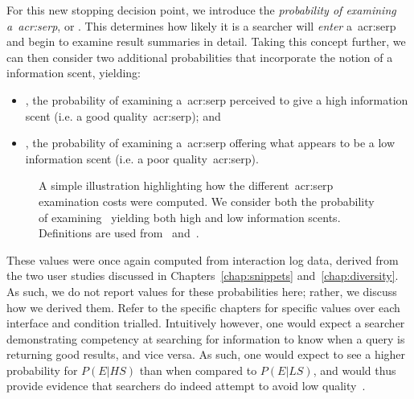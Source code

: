  For this new stopping decision point, we introduce the \emph{probability of examining a~\gls{acr:serp}}, or . This determines how likely it is a searcher will \emph{enter} a~\gls{acr:serp} and begin to examine result summaries in detail. Taking this concept further, we can then consider two additional probabilities that incorporate the notion of a~ information scent, yielding:

\begin{itemize}
    \item{, the probability of examining a~\gls{acr:serp} perceived to give a high information scent (i.e. a good quality~\gls{acr:serp}); and}
    \item{, the probability of examining a~\gls{acr:serp} offering what appears to be a low information scent (i.e. a poor quality~\gls{acr:serp}).}
\end{itemize}

\begin{figure}[t!]
    \centering
    \caption[Computing~\gls{acr:serp} examination probabilities]{A simple illustration highlighting how the different~\gls{acr:serp} examination costs were computed. We consider both the probability of examining~ yielding both high and low information scents. Definitions are used from~\cite{wu2014information_scent} and~\cite{hassan2013serp_abandonment}.}
    \label{fig:serp_probabilities}
\end{figure}

These values were once again computed from interaction log data, derived from the two user studies discussed in Chapters~\ref{chap:snippets} and~\ref{chap:diversity}. As such, we do not report values for these probabilities here; rather, we discuss how we derived them. Refer to the specific chapters for specific values over each interface and condition trialled. Intuitively however, one would expect a searcher demonstrating competency at searching for information to know when a query is returning good results, and vice versa. As such, one would expect to see a higher probability for $P(E|HS)$ than when compared to $P(E|LS)$, and would thus provide evidence that searchers do indeed attempt to avoid low quality~.

